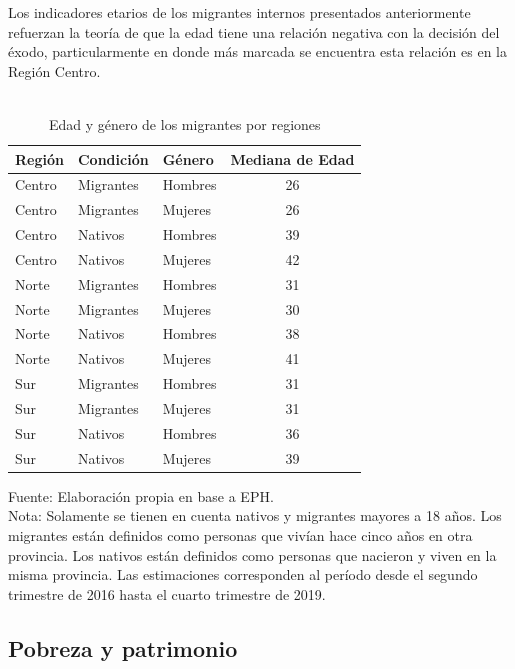 \documentclass[12pt,a4paper]{article}
\begin{document}
Los indicadores etarios de los migrantes internos presentados anteriormente refuerzan la teoría de que la edad tiene una relación negativa con la decisión del éxodo, particularmente en donde más marcada se encuentra esta relación es en la Región Centro.

\begin{table}[htbp!]
\caption{\\Edad y género de los migrantes por regiones} 
\centering
\footnotesize
\begin{tabular}{lllc}
  \hline
  \hline
Región & Condición & Género & Mediana de Edad \\ 
  \hline
  \hline
 Centro & Migrantes & Hombres & 26 \\ 
 Centro & Migrantes & Mujeres & 26 \\ 
 Centro & Nativos & Hombres & 39 \\ 
 Centro & Nativos & Mujeres & 42 \\ 
 Norte & Migrantes & Hombres & 31\\ 
 Norte & Migrantes & Mujeres & 30 \\ 
 Norte & Nativos & Hombres & 38 \\ 
 Norte & Nativos & Mujeres & 41 \\ 
 Sur & Migrantes & Hombres & 31 \\ 
 Sur & Migrantes & Mujeres & 31 \\ 
 Sur & Nativos & Hombres & 36\\ 
 Sur & Nativos & Mujeres & 39 \\ 
   \hline
\end{tabular}
\label{cuadro:edad_mig}
\begin{flushleft}
\begin{scriptsize}
Fuente: Elaboración propia en base a EPH.\\
Nota: Solamente se tienen en cuenta nativos y migrantes mayores a 18 años. Los migrantes están definidos como personas que vivían hace cinco años en otra provincia. Los nativos están definidos como personas que nacieron y viven en la misma provincia. Las estimaciones corresponden al período desde el segundo trimestre de 2016 hasta el cuarto trimestre de 2019.\\
\end{scriptsize}
\end{flushleft}
\end{table}


\newpage
\subsection{Pobreza y patrimonio}
\end{document}
